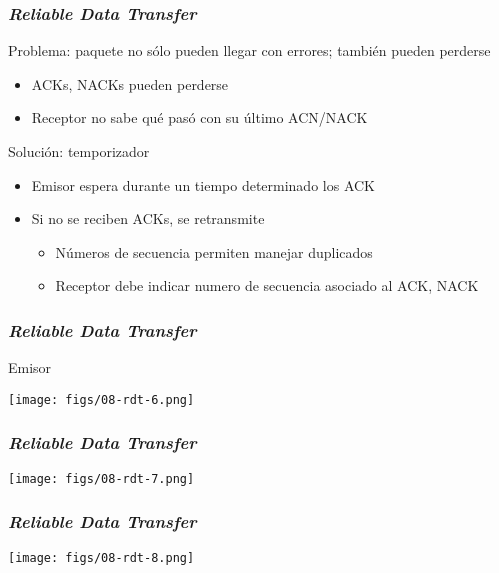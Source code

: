 \documentclass[letter]{beamer}
\begin{document}
\begin{frame}
  \frametitle{{\em Reliable Data Transfer}}

  Problema: paquete no sólo pueden llegar con errores; también pueden perderse
  \begin{itemize}
    \item ACKs, NACKs pueden perderse
    \item Receptor no sabe qué pasó con su último ACN/NACK
  \end{itemize}
  Solución: temporizador
  \begin{itemize}
    \item Emisor espera durante un tiempo determinado los ACK
    \item Si no se reciben ACKs, se retransmite
      \begin{itemize}
        \item Números de secuencia permiten manejar duplicados
        \item Receptor debe indicar numero de secuencia asociado al ACK, NACK
      \end{itemize}
  \end{itemize}

\end{frame}
\begin{frame}
  \frametitle{{\em Reliable Data Transfer}}

  Emisor
  \begin{center}
    \texttt{[image: figs/08-rdt-6.png]}
  \end{center}

\end{frame}

\begin{frame}
  \frametitle{{\em Reliable Data Transfer}}

  \begin{center}
    \texttt{[image: figs/08-rdt-7.png]}
  \end{center}


\end{frame}
\begin{frame}
  \frametitle{{\em Reliable Data Transfer}}

  \begin{center}
    \texttt{[image: figs/08-rdt-8.png]}
  \end{center}


\end{frame}
\end{document}
